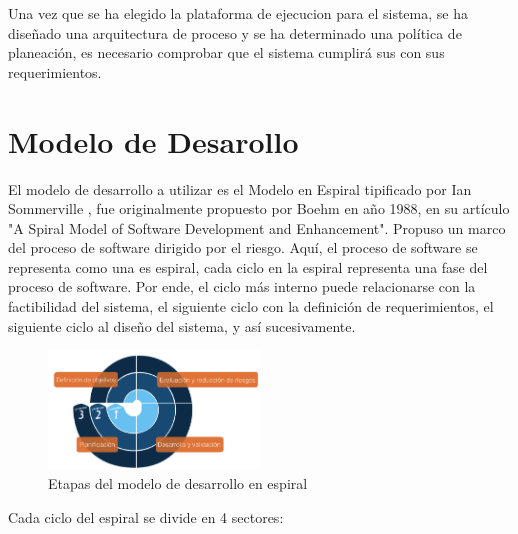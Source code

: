 Una vez que se ha elegido la plataforma de ejecucion para el sistema, se ha diseñado una arquitectura de proceso y se ha determinado una política de
planeación, es necesario comprobar que el sistema cumplirá sus con sus requerimientos.

\section{Modelo de Desarollo}

El modelo de desarrollo a utilizar es el Modelo en Espiral tipificado por Ian Sommerville\cite{Etiqueta00}%
, fue originalmente propuesto por Boehm en año 1988, en su artículo "A Spiral Model of Software Development and Enhancement". Propuso un
marco del proceso de software dirigido por el riesgo. Aquí, el proceso de software se representa como una es espiral, cada ciclo en la espiral
representa una fase del proceso de software. Por ende, el ciclo más interno puede relacionarse con la factibilidad del sistema, el siguiente ciclo
con la definición de requerimientos, el siguiente ciclo al diseño del sistema, y así sucesivamente. %

\begin{figure}[h!]
 \begin{center}
  \includegraphics[width=0.5\textwidth,keepaspectratio=true]{./images/ESPIRAL}
  \caption{Etapas del modelo de desarrollo en espiral}
  \label{fig:esquema}
 \end{center}
\end{figure}

Cada ciclo del espiral se divide en 4 sectores:
 
